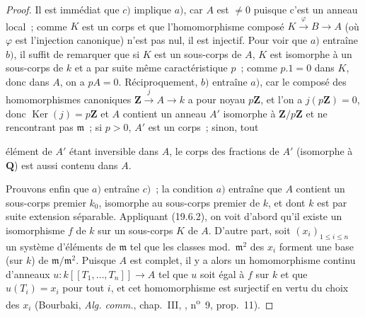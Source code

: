 \begin{proof}
Il est immédiat que $c)$ implique $a)$, car $A$ est $\neq0$ puisque c'est un
anneau local~; comme $K$ est un corps et que l'homomorphisme composé
$K\xrightarrow{\varphi}B\to A$ (où $\varphi$ est l'injection canonique) n'est
pas nul, il est injectif. Pour voir que $a)$ entraîne $b)$, il suffit de
remarquer que si $K$ est un sous-corps de $A$, $K$ est isomorphe à un
sous-corps de $k$ et a par suite même caractéristique $p$~; comme $p.1=0$ dans
$K$, donc dans $A$, on a $pA=0$. Réciproquement, $b)$ entraîne $a)$, car le
composé des homomorphismes canoniques
$\mathbf Z\xrightarrow{j}A\to k$ a pour noyau $p\mathbf Z$, et l'on a
$j(p\mathbf Z)=0$, donc $\operatorname{Ker}(j)=p\mathbf Z$ et $A$ contient un
anneau $A'$ isomorphe à $\mathbf Z/p\mathbf Z$ et ne rencontrant pas
$\mathfrak m$~; si $p>0$, $A'$ est un corps~; sinon, tout


élément de $A'$ étant inversible dans $A$, le corps des fractions de $A'$
(isomorphe à $\mathbf Q$) est aussi contenu dans $A$.

Prouvons enfin que $a)$ entraîne $c)$~; la condition $a)$ entraîne que $A$
contient un sous-corps premier $k_0$, isomorphe au sous-corps premier de $k$,
et dont $k$ est par suite extension séparable. Appliquant (19.6.2), on voit
d'abord qu'il existe un isomorphisme $f$ de $k$ sur un sous-corps $K$ de $A$.
D'autre part, soit $(x_i)_{1\leq i\leq n}$ un système d'éléments de
$\mathfrak m$ tel que les classes mod.~$\mathfrak m^2$ des $x_i$ forment une
base (sur $k$) de $\mathfrak m/\mathfrak m^2$. Puisque $A$ est complet, il y a
alors un homomorphisme continu d'anneaux
$u:k[[T_1,\ldots,T_n]]\to A$ tel que $u$ soit égal à $f$ sur $k$ et que
$u(T_i)=x_i$ pour tout $i$, et cet homomorphisme est surjectif en vertu du
choix des $x_i$ (Bourbaki, \emph{Alg. comm.}, chap.~III, ,
n\textsuperscript{o}~9, prop.~11).
\end{proof}

